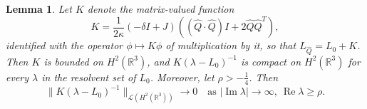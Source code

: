 \documentclass[11pt]{article}
\DeclareMathOperator{\real}{Re}
\DeclareMathOperator{\imag}{Im}
\newtheorem{lemma}[definition]{Lemma}
\begin{document}
\begin{lemma}\label{lemma:K-resolvent}
  Let \(K\) denote the matrix-valued function
  \begin{equation*}
    K = \frac{1}{2\kappa}(-\delta I + J)((\hat{Q}\cdot\hat{Q})I + 2\hat{Q}\hat{Q}^{T}),
  \end{equation*}
  identified with the operator \(\phi \mapsto K\phi\) of
  multiplication by it, so that \(L_{\hat{Q}} = L_{0} + K\). Then
  \(K\) is bounded on \(H^{2}(\mathbb{R}^{3})\), and
  \(K(\lambda - L_{0})^{-1}\) is compact on \(H^{2}(\mathbb{R}^{3})\)
  for every \(\lambda\) in the resolvent set of \(L_{0}\). Moreover,
  let \(\rho > -\frac{1}{4}\). Then
  \begin{equation}\label{eq:K-resolvent-decay}
    \|K(\lambda - L_{0})^{-1}\|_{\mathcal{L}(H^{2}(\mathbb{R}^{3}))}
    \to 0
    \quad\text{as } |\imag \lambda| \to \infty,\ \real \lambda \geq \rho.
  \end{equation}
\end{lemma}
\end{document}
